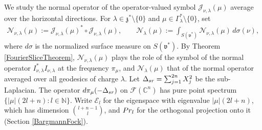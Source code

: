 \documentclass[11pt]{amsart}
\theoremstyle{plain}
\theoremstyle{definition}
\theoremstyle{remark}
\numberwithin{equation}{section}
\def\fz{\mathfrak{z}}
\def\fv{\mathfrak{v}}
\def\cE{\mathcal{E}}
\def\cN{\mathcal{N}}
\def\cJ{\mathcal{J}}
\def\cF{\mathcal{F}}
\def\mz{\setminus\{0\}}
\def\C{{\mathbb C}}%
\def\N{{\mathbb N}}%
\numberwithin{equation}{section}
\begin{document}
We study the normal operator of the operator-valued symbol $\cJ_{\nu, \lambda}(\mu)$ average over the horizontal directions. For $\lambda\in \fz^*\mz$ and $\mu\in \Gamma_\lambda^*\mz$, set
\begin{align*}
	\cN_{\nu, \lambda}(\mu):=\cJ_{\nu, \lambda}(\mu)^*\circ\cJ_{\nu, \lambda}(\mu), \qquad \cN_\lambda(\mu):=\int_{S(\fv^*)}\cN_{\nu, \lambda}(\mu)\, d\sigma(\nu),
\end{align*}
where $d\sigma$ is the normalized surface measure on $S(\fv^*)$. By Theorem \ref{FourierSliceTheorem}, $\cN_{\nu, \lambda}(\mu)$ plays the role of the symbol of the normal operator $I_{\nu, \lambda}^*I_{\nu, \lambda}$ at the frequency $\pi_\mu$, and $\cN_\lambda(\mu)$ that of the normal operator averaged over all geodesics of charge $\lambda$. Let $\Delta_{\rm{sr}}=\sum_{j=1}^{2n}X_j^2$ be the sub-Laplacian. The operator $d\pi_\mu(-\Delta_{\rm{sr}})$ on $\cF(\C^n)$ has pure point spectrum $\{|\mu|(2l+n): l\in \N\}$. Write $\cE_l$ for the eigenspace with eigenvalue $|\mu|(2l+n)$, which has dimension $\binom{l+n-1}{l}$, and ${\rm Pr}_l$ for the orthogonal projection onto it (Section \ref{BargmannFock}).
\end{document}
